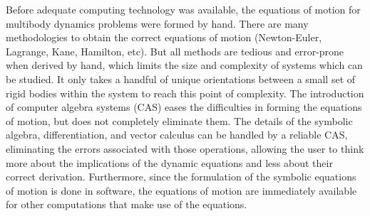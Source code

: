 \documentclass[twocolumn,10pt]{asme2e}
\begin{document}
Before adequate computing technology was available, the equations of motion for
multibody dynamics problems were formed by hand. There are many
methodologies to obtain the correct equations of motion (Newton-Euler,
Lagrange, Kane, Hamilton, etc). But all methods are tedious and error-prone
when derived by hand, which limits the size and complexity of systems which can
be studied. It only takes a handful of unique orientations between a small set
of rigid bodies within the system to reach this point of complexity. The
introduction of computer algebra systems (CAS) eases the difficulties in
forming the equations of motion, but does not completely eliminate them. The
details of the symbolic algebra, differentiation, and vector calculus can be
handled by a reliable CAS, eliminating the errors associated with those
operations, allowing the user to think more about the implications of the
dynamic equations and less about their correct derivation. Furthermore, since
the formulation of the symbolic equations of motion is done in software, the
equations of motion are immediately available for other computations that make
use of the equations.
\end{document}
